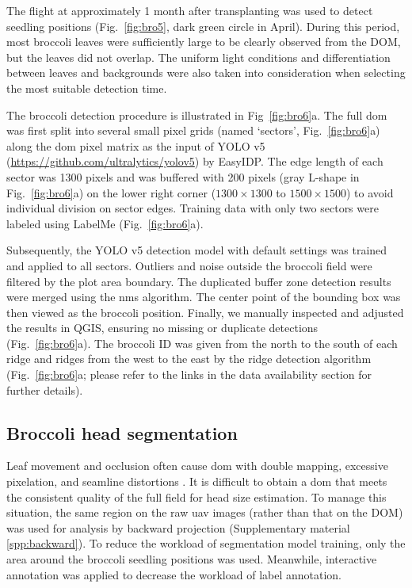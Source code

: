 The flight at approximately 1 month after transplanting was used to detect seedling positions (Fig.~\ref{fig:bro5}, dark green circle in April). During this period, most broccoli leaves were sufficiently large to be clearly observed from the DOM, but the leaves did not overlap. The uniform light conditions and differentiation between leaves and backgrounds were also taken into consideration when selecting the most suitable detection time.

The broccoli detection procedure is illustrated in Fig~\ref{fig:bro6}a. The full \gls{dom} was first split into several small pixel grids (named `sectors', Fig.~\ref{fig:bro6}a) along the \gls{dom} pixel matrix as the input of YOLO v5 (\url{https://github.com/ultralytics/yolov5}) by EasyIDP. The edge length of each sector was 1300 pixels and was buffered with 200 pixels (gray L-shape in Fig.~\ref{fig:bro6}a) on the lower right corner ($1300 \times 1300$ to $1500 \times 1500$) to avoid individual division on sector edges. Training data with only two sectors were labeled using LabelMe (Fig.~\ref{fig:bro6}a). 

Subsequently, the YOLO v5 detection model with default settings was trained and applied to all sectors. Outliers and noise outside the broccoli field were filtered by the plot area boundary. The duplicated buffer zone detection results were merged using the \gls{nms} algorithm. The center point of the bounding box was then viewed as the broccoli position. Finally, we manually inspected and adjusted the results in QGIS, ensuring no missing or duplicate detections (Fig.~\ref{fig:bro6}a). The broccoli ID was given from the north to the south of each ridge and ridges from the west to the east by the ridge detection algorithm (Fig.~\ref{fig:bro6}a; please refer to the links in the data availability section for further details). 

\subsection{Broccoli head segmentation}

Leaf movement and occlusion often cause \gls{dom} with double mapping, excessive pixelation, and seamline distortions \citep{lin_new_2021}. It is difficult to obtain a \gls{dom} that meets the consistent quality of the full field for head size estimation. To manage this situation, the same region on the raw \gls{uav} images (rather than that on the DOM) was used for analysis by backward projection \citep{wang_easyidp_2021} (Supplementary material \ref{spp:backward}). To reduce the workload of segmentation model training, only the area around the broccoli seedling positions was used. Meanwhile, interactive annotation \citep{ghosal_weakly_2019} was applied to decrease the workload of label annotation. 

